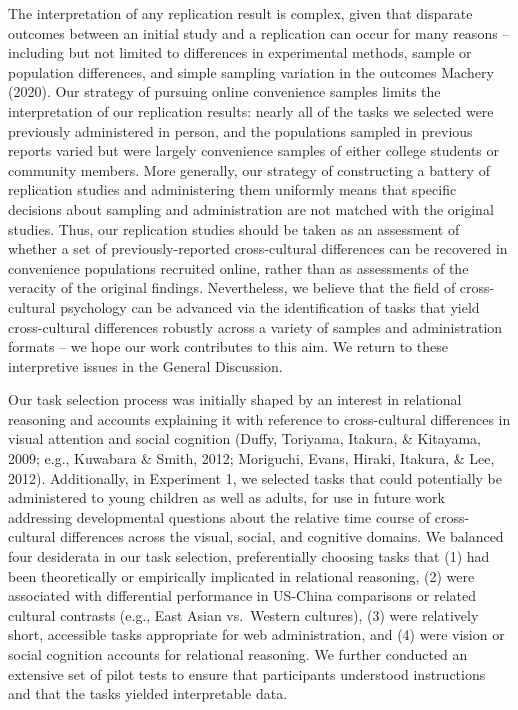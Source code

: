 \documentclass[
  man,floatsintext]{apa6}
\begin{document}
The interpretation of any replication result is complex, given that disparate outcomes between an initial study and a replication can occur for many reasons -- including but not limited to differences in experimental methods, sample or population differences, and simple sampling variation in the outcomes Machery (2020). Our strategy of pursuing online convenience samples limits the interpretation of our replication results: nearly all of the tasks we selected were previously administered in person, and the populations sampled in previous reports varied but were largely convenience samples of either college students or community members. More generally, our strategy of constructing a battery of replication studies and administering them uniformly means that specific decisions about sampling and administration are not matched with the original studies. Thus, our replication studies should be taken as an assessment of whether a set of previously-reported cross-cultural differences can be recovered in convenience populations recruited online, rather than as assessments of the veracity of the original findings. Nevertheless, we believe that the field of cross-cultural psychology can be advanced via the identification of tasks that yield cross-cultural differences robustly across a variety of samples and administration formats -- we hope our work contributes to this aim. We return to these interpretive issues in the General Discussion.

Our task selection process was initially shaped by an interest in relational reasoning and accounts explaining it with reference to cross-cultural differences in visual attention and social cognition (Duffy, Toriyama, Itakura, \& Kitayama, 2009; e.g., Kuwabara \& Smith, 2012; Moriguchi, Evans, Hiraki, Itakura, \& Lee, 2012). Additionally, in Experiment 1, we selected tasks that could potentially be administered to young children as well as adults, for use in future work addressing developmental questions about the relative time course of cross-cultural differences across the visual, social, and cognitive domains. We balanced four desiderata in our task selection, preferentially choosing tasks that (1) had been theoretically or empirically implicated in relational reasoning, (2) were associated with differential performance in US-China comparisons or related cultural contrasts (e.g., East Asian vs.~Western cultures), (3) were relatively short, accessible tasks appropriate for web administration, and (4) were vision or social cognition accounts for relational reasoning. We further conducted an extensive set of pilot tests to ensure that participants understood instructions and that the tasks yielded interpretable data.
\end{document}

